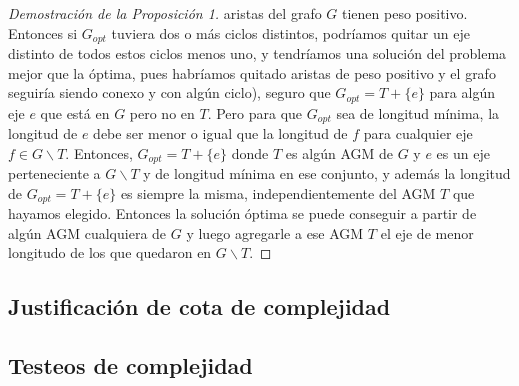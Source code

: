 \documentclass[11pt, a4paper, twoside]{article}
\begin{document}
\begin{proof}[Demostración de la Proposición 1]
aristas del grafo $G$ tienen peso positivo. Entonces si $G_{opt}$ tuviera dos o más ciclos distintos,
podríamos quitar un eje distinto de todos estos ciclos menos uno, y tendríamos una solución del problema 
mejor que la óptima, pues habríamos quitado aristas de peso positivo y el grafo seguiría siendo conexo
y con algún ciclo), seguro que
$G_{opt} = T + \{e\}$ para algún eje $e$ que está en $G$ pero no en $T$. Pero para que 
$G_{opt}$ sea de longitud mínima, la longitud de $e$ debe ser menor o igual que la 
longitud de $f$ para cualquier eje $f \in G \backslash T$. Entonces, 
$G_{opt} = T + \{e\}$ donde $T$ es algún AGM de $G$ y $e$ es un eje perteneciente a
$G \backslash T$ y de longitud mínima en ese conjunto, y además la longitud de
$G_{opt} = T + \{e\}$ es siempre la misma, independientemente del AGM $T$ que hayamos
elegido. Entonces la solución óptima se puede conseguir a partir de algún AGM cualquiera de $G$
y luego agregarle a ese AGM $T$ el eje de menor longitudo de los que quedaron en $G \backslash T$.
\end{proof}

\newpage
\subsection{Justificación de cota de complejidad}

\begin{algorithm}[H]

\caption{Pseudocódigo para el algoritmo empleado en la resolución}
\end{algorithm}

\subsection{Testeos de complejidad}



\end{document}
